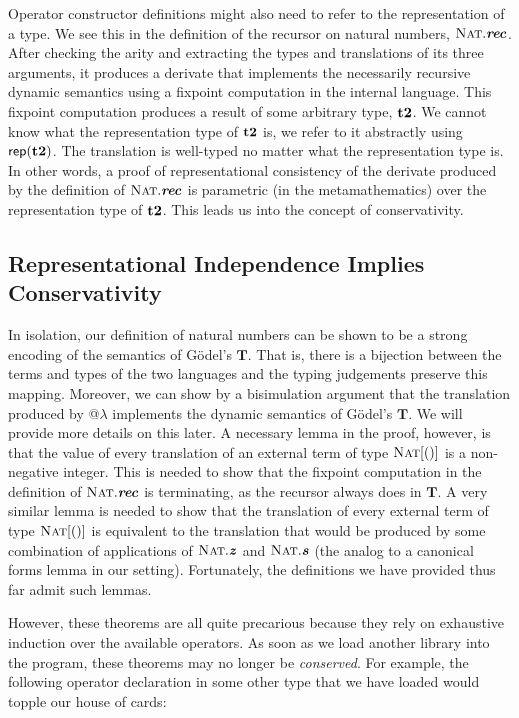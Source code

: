 \documentclass[9pt,preprint]{sigplanconf}
\begin{document}
Operator constructor definitions might also need to refer to the representation of a type. We see this in the definition of the recursor on natural numbers, $\textsc{Nat}.\textbf{\textit{rec}}$. After checking the arity and extracting the types and translations of its three arguments, it produces a derivate that implements the necessarily recursive dynamic semantics using a fixpoint computation in the internal language. This fixpoint computation produces a result of some arbitrary type, ${\textbf{t2}}$. We cannot know what the representation type of ${\textbf{t2}}$ is, we refer to it abstractly using ${\sf rep}({\textbf{t2}})$. The translation is well-typed no matter what the representation type is. In other words, a proof of representational consistency of the derivate produced by the definition of $\textsc{Nat}.\textbf{\textit{rec}}$ is parametric (in the metamathematics) over the representation type of ${\textbf{t2}}$. This leads us into the concept of conservativity.

\subsection{Representational Independence Implies Conservativity}
In isolation, our definition of natural numbers can be shown to be a strong encoding of the semantics of G\"odel's $\mathbf{T}$. That is, there is a bijection between the terms and types of the two languages and the typing judgements preserve this mapping. Moreover, we can show by a bisimulation argument that the translation produced by @$\lambda$ implements the dynamic semantics of G\"odel's $\mathbf{T}$. We will provide more details on this later. A necessary lemma in the proof, however, is that the value of every translation of an external term of type $\textsc{Nat}[()]$ is a non-negative integer. This is needed to show that the fixpoint computation in the definition of $\textsc{Nat}.\textbf{\textit{rec}}$ is terminating, as the recursor always does in $\mathbf{T}$. A very similar lemma is needed to show that the translation of every external term of type $\textsc{Nat}[()]$ is equivalent to the translation that would be produced by some combination of applications of $\textsc{Nat}.\textbf{\textit{z}}$ and $\textsc{Nat}.\textbf{\textit{s}}$ (the analog to a canonical forms lemma in our setting). Fortunately, the definitions we have provided thus far admit such lemmas.

However, these theorems are all quite precarious because they rely on exhaustive induction over the available operators. As soon as we load another library into the program, these theorems may no longer be \emph{conserved}. For example, the following operator declaration in some other type that we have loaded would topple our house of cards:
\end{document}
